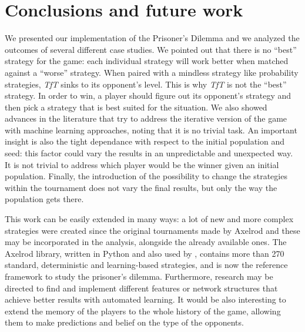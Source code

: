 \documentclass[journal,10pt,twoside]{IEEEtran}
\begin{document}
\section{Conclusions and future work} \label{s:conc}
We presented our implementation of the Prisoner's Dilemma and we analyzed the outcomes of several different case studies.
We pointed out that there is no ``best'' strategy for the game: each individual strategy will work better when matched against a ``worse'' strategy. When paired with a mindless strategy like probability strategies, \textit{TfT} sinks to its opponent's level. This is why \textit{TfT} is not the ``best'' strategy. In order to win, a player should figure out its opponent's strategy and then pick a strategy that is best suited for the situation.
We also showed advances in the literature that try to address the iterative version of the game with machine learning approaches, noting that it is no trivial task. 
An important insight is also the tight dependance with respect to the initial population and seed: this factor could vary the results in an unpredictable and unexpected way. It is not trivial to address which player would be the winner given an initial population.
Finally, the introduction of the possibility to change the strategies within the tournament does not vary the final results, but only the way the population gets there.

This work can be easily extended in many ways: a lot of new and more complex strategies were created since the original tournaments made by Axelrod and these may be incorporated in the analysis, alongside the already available ones.
The Axelrod library, \cite{Knight2016Axel,axel-lib} written in Python and also used by \cite{plosRLdominant}, contains more than 270 standard, deterministic and learning-based strategies, and is now the reference framework to study the prisoner's dilemma.
Furthermore, research may be directed to find and implement different features or network structures that achieve better results with automated learning. It would be also interesting to extend the memory of the players to the whole history of the game, allowing them to make predictions and belief on the type of the opponents.

\balance



\onecolumn
{} \label{s:appendix}

\end{document}
